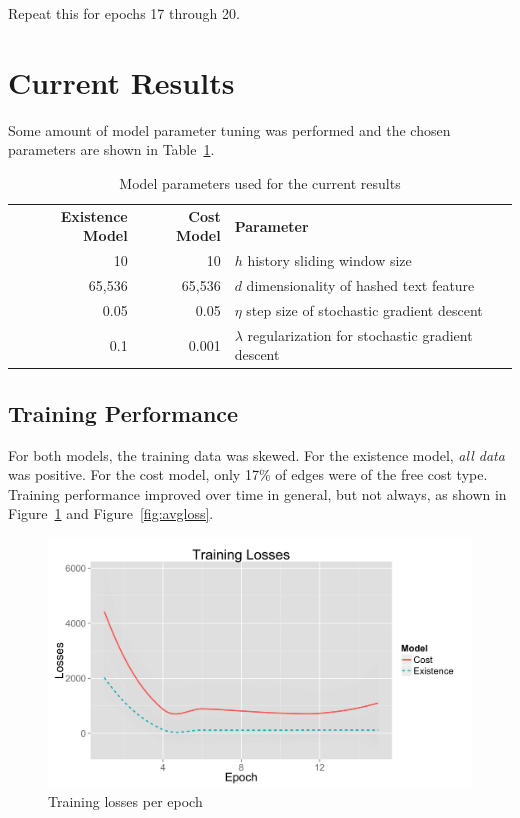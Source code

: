 \documentclass{article} %
\begin{document}
Repeat this for epochs 17 through 20.

\section{Current Results}

Some amount of model parameter tuning was performed and the chosen
parameters are shown in Table~\ref{tab:param}.

\begin{table}
\begin{tabular}{rrl} 
\textbf{Existence Model} & \textbf{Cost Model} & \textbf{Parameter} \\
10 & 10 & $h$ history sliding window size\\
65,536 & 65,536 & $d$ dimensionality of hashed text feature\\
0.05 & 0.05 & $\eta$ step size of stochastic gradient descent\\
0.1 & 0.001 & $\lambda$ regularization for stochastic gradient descent\\
\end{tabular}
\caption{Model parameters used for the current results}
\label{tab:param}
\end{table}

\subsection{Training Performance}

For both models, the training data was skewed. For the existence model,
\emph{all data} was positive.  For the cost model, only 17\% of edges were of
the free cost type.  Training performance improved over time in general, but
not always, as shown in Figure~\ref{fig:loss} and Figure~\ref{fig:avgloss}.

\begin{figure}
  \begin{center}
    \includegraphics[scale=.1]{trainingLosses.png}
  \end{center}
  \caption{Training losses per epoch}
  \label{fig:loss}
\end{figure}
\end{document}
